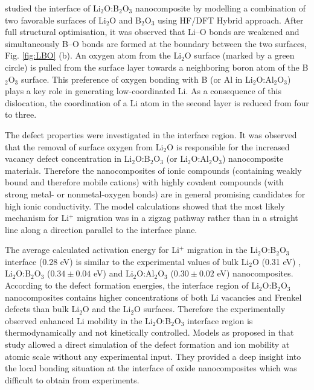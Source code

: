 \documentclass[../main.tex]{subfiles}
\begin{document}
\citeauthor{Rana-PRL-2007} studied the interface of Li$_2$O:B$_2$O$_3$ nanocomposite by modelling a combination of two favorable surfaces of Li$_2$O and B$_2$O$_3$ using HF/DFT Hybrid approach. \cite{Rana-PRL-2007,Rana-JPCM-2012} After full structural optimisation, it was observed that Li--O bonds are weakened and simultaneously B--O bonds are formed at the boundary between the two surfaces, Fig. \ref{fig:LBO} (b). An oxygen atom from the Li$_2$O surface (marked by a green circle) is pulled from the surface layer towards a neighboring boron atom of the B$_2$O$_3$ surface. This preference of oxygen bonding with B (or Al in Li$_2$O:Al$_2$O$_3$) plays a key role in generating low-coordinated Li. As a consequence of this dislocation, the coordination of a Li atom in the second layer is reduced from four to three. 

The defect properties were investigated in the interface region. It was observed that the removal of surface oxygen from Li$_2$O is responsible for the increased vacancy defect concentration in Li$_2$O:B$_2$O$_3$ (or Li$_2$O:Al$_2$O$_3$) nanocomposite materials. Therefore the nanocomposites of ionic compounds (containing weakly bound and therefore mobile cations) with highly covalent compounds (with strong metal- or nonmetal-oxygen bonds) are in general promising candidates for high ionic conductivity. The model calculations showed that the most likely mechanism for Li$^+$ migration was in a zigzag pathway rather than in a straight line along a direction parallel to the interface plane. 

The average calculated activation energy for Li$^+$ migration in the Li$_2$O:B$_2$O$_3$ interface (0.28 eV) \cite{Rana-PRL-2007,Rana-JPCM-2012} is similar to the experimental values of bulk Li$_2$O (0.31 eV) \cite{Heitjans_2003}, Li$_2$O:B$_2$O$_3$ ($0.34 \pm 0.04$ eV) \cite {Indris2002} and Li$_2$O:Al$_2$O$_3$ ($0.30 \pm 0.02$ eV) \cite{B300908D} nanocomposites. According to the defect formation energies, the interface region of Li$_2$O:B$_2$O$_3$ nanocomposites contains higher concentrations of both Li vacancies and Frenkel defects than bulk Li$_2$O and the Li$_2$O surfaces. \cite{Rana-PRL-2007,Rana-JPCM-2012} Therefore the experimentally observed enhanced Li mobility in the Li$_2$O:B$_2$O$_3$ interface region is thermodynamically and not kinetically controlled. Models as proposed in that study allowed a direct simulation of the defect formation and ion mobility at atomic scale without any experimental input. They provided a deep insight into the local bonding situation at the interface of oxide nanocomposites which was difficult to obtain from experiments.
\end{document}
